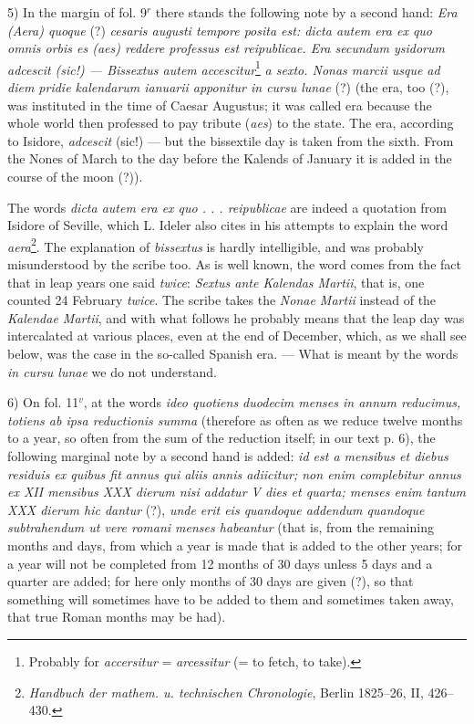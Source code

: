 \documentclass[11pt]{article}
\newcommand{\Pg}[1]{\marginpar{\footnotesize\color{gray}#1}}
\begin{document}
\par 5) In the margin of fol. 9$^{r}$ there stands the following note by a second hand: \emph{Era (Aera) quoque} (?) \emph{cesaris augusti tempore posita est: dicta autem era ex quo omnis orbis es (aes) reddere professus est reipublicae. Era secundum ysidorum adcescit (sic!) — Bissextus autem} \Pg{XVIII}\emph{accescitur}\footnote{Probably for \emph{accersitur} = \emph{arcessitur} (= to fetch, to take).} \emph{a sexto. Nonas marcii usque ad diem pridie kalendarum ianuarii apponitur in cursu lunae} (?) (the era, too (?), was instituted in the time of Caesar Augustus; it was called era because the whole world then professed to pay tribute (\emph{aes}) to the state. The era, according to Isidore, \emph{adcescit} (sic!) — but the bissextile day is taken from the sixth. From the Nones of March to the day before the Kalends of January it is added in the course of the moon (?)).\par
\par The words \emph{dicta autem era ex quo . . . reipublicae} are indeed a quotation from Isidore of Seville, which L. Ideler also cites in his attempts to explain the word \emph{aera}\footnote{\emph{Handbuch der mathem. u. technischen Chronologie}, Berlin 1825–26, II, 426–430.}. The explanation of \emph{bissextus} is hardly intelligible, and was probably misunderstood by the scribe too. As is well known, the word comes from the fact that in leap years one said \emph{twice}: \emph{Sextus ante Kalendas Martii}, that is, one counted 24 February \emph{twice}. The scribe takes the \emph{Nonae Martii} instead of the \emph{Kalendae Martii}, and with what follows he probably means that the leap day was intercalated at various places, even at the end of December, which, as we shall see below, was the case in the so-called Spanish era. — What is meant by the words \emph{in cursu lunae} we do not understand.\par
\par 6) On fol. 11$^{v}$, at the words \emph{ideo quotiens duodecim menses in annum reducimus, totiens ab ipsa reductionis summa} (therefore as often as we reduce twelve months to a year, so often from the sum of the reduction itself; in our text p. 6), the following marginal note by a second hand is added: \emph{id est a mensibus et diebus residuis ex quibus fit annus qui aliis annis adiicitur; non enim complebitur annus ex XII mensibus XXX dierum nisi addatur V dies et quarta; menses enim tantum XXX dierum hic dantur} (?), \emph{unde erit eis quandoque addendum quandoque subtrahendum ut vere romani menses habeantur} (that is, from the remaining months and days, from which a year is made that is added to the other years; for a year will not be completed from 12 months of 30 days unless 5 days and a quarter are added; for here only months of 30 days are given (?), so that something will sometimes have to be added to them and sometimes taken away, that true Roman months may be had).\par
\end{document}
